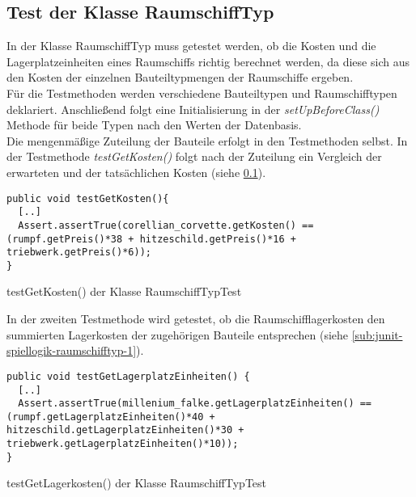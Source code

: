 \subsection{Test der Klasse RaumschiffTyp}
\label{sub:junit-spiellogik-raumschifftyp}  

In der Klasse RaumschiffTyp muss getestet werden, ob die Kosten und die Lagerplatzeinheiten eines Raumschiffs richtig berechnet werden, da diese sich aus den Kosten der einzelnen Bauteiltypmengen der Raumschiffe ergeben.
\\
Für die Testmethoden werden verschiedene Bauteiltypen und Raumschifftypen deklariert. Anschließend folgt eine Initialisierung in der \textit{setUpBeforeClass()} Methode für beide Typen nach den Werten der Datenbasis.
\\
Die mengenmäßige Zuteilung der Bauteile erfolgt in den Testmethoden selbst. In der Testmethode \textit{testGetKosten()} folgt nach der Zuteilung ein Vergleich der erwarteten und der tatsächlichen Kosten (siehe \ref{sub:junit-spiellogik-raumschifftyp}).

\begin{programm}[ht]
\begin{lstlisting}[breaklines=true]
public void testGetKosten(){
  [..]
  Assert.assertTrue(corellian_corvette.getKosten() == (rumpf.getPreis()*38 + hitzeschild.getPreis()*16 + triebwerk.getPreis()*6));
}
\end{lstlisting}
\caption{testGetKosten() der Klasse RaumschiffTypTest\label{sub:junit-spiellogik-raumschifftyp}}
\end{programm}

In der zweiten Testmethode wird getestet, ob die Raumschifflagerkosten den summierten Lagerkosten der zugehörigen Bauteile entsprechen (siehe \ref{sub:junit-spiellogik-raumschifftyp-1}).
 
\begin{programm}[ht]
\begin{lstlisting}[breaklines=true]
public void testGetLagerplatzEinheiten() {
  [..]
  Assert.assertTrue(millenium_falke.getLagerplatzEinheiten() == (rumpf.getLagerplatzEinheiten()*40 + hitzeschild.getLagerplatzEinheiten()*30 + triebwerk.getLagerplatzEinheiten()*10));
}
\end{lstlisting}
\caption{testGetLagerkosten() der Klasse RaumschiffTypTest\label{sub:junit-spiellogik-raumschifftyp-1}}
\end{programm}
